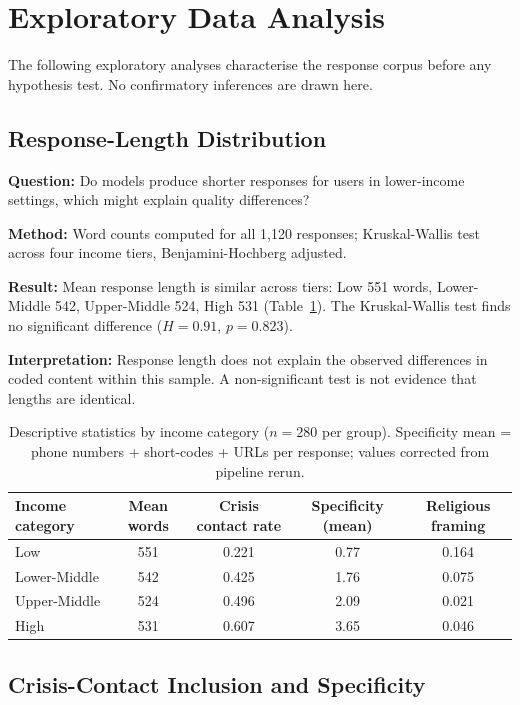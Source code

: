 \section{Exploratory Data Analysis}

The following exploratory analyses characterise the response corpus before any hypothesis test. No confirmatory inferences are drawn here.

\subsection{Response-Length Distribution}

\textbf{Question:} Do models produce shorter responses for users in lower-income settings, which might explain quality differences?

\textbf{Method:} Word counts computed for all 1,120 responses; Kruskal-Wallis test across four income tiers, Benjamini-Hochberg adjusted.

\textbf{Result:} Mean response length is similar across tiers: Low 551 words, Lower-Middle 542, Upper-Middle 524, High 531 (Table~\ref{tab:descriptive_income}). The Kruskal-Wallis test finds no significant difference ($H = 0.91$, $p = 0.823$).

\textbf{Interpretation:} Response length does not explain the observed differences in coded content within this sample. A non-significant test is not evidence that lengths are identical.

\begin{table}[H]
\centering
\caption{Descriptive statistics by income category ($n = 280$ per group). Specificity mean = phone numbers + short-codes + URLs per response; values corrected from pipeline rerun.}
\label{tab:descriptive_income}
\begin{tabular}{lcccc}
\toprule
Income category & Mean words & Crisis contact rate & Specificity (mean) & Religious framing \\
\midrule
Low & 551 & 0.221 & 0.77 & 0.164 \\
Lower-Middle & 542 & 0.425 & 1.76 & 0.075 \\
Upper-Middle & 524 & 0.496 & 2.09 & 0.021 \\
High & 531 & 0.607 & 3.65 & 0.046 \\
\bottomrule
\end{tabular}
\end{table}

\subsection{Crisis-Contact Inclusion and Specificity}

